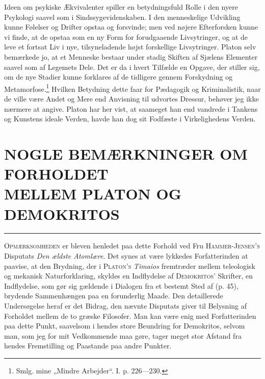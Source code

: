 \documentclass[12pt,a4paper,openany]{book}
\newcommand{\opage}[1]{\marginnote{\footnotesize\textit{[#1]}}}
\newcommand{\essay}[2][]{\chapter*{#2}\addcontentsline{toc}{chapter}{#1}}   %
\newcommand{\streg}{\begin{center}\rule{3em}{0.4pt}\end{center}}
\begin{document}
Ideen om psykiske Ækvivalenter spiller en betydningsfuld
Rolle i den nyere Psykologi saavel som i Sindssygevidenskaben.
I den menneskelige Udvikling kunne Følelser og Drifter opstaa og
forsvinde; men ved nøjere Efterforsken kunne vi finde, at de
opstaa som en ny Form for forudgaaende Livsytringer, og at
de leve et fortsat Liv i nye, tilsyneladende højst forskellige Livsytringer.
Platon selv bemærkede jo, at et Menneske bestaar
under stadig Skiften af Sjælens Elementer saavel som af Legemets
Dele. Det er da i hvert Tilfælde en Opgave, der stiller
sig, om de nye Stadier kunne forklares af de tidligere gennem
\setcounter{footnote}{0}%
\opage{93}Forskydning og Metamorfose.\footnote[1]{Smlg. mine „Mindre Arbejder“. I. p. 226---230.} Hvilken Betydning dette faar
for Pædagogik og Kriminalistik, naar de ville være Andet og
Mere end Anvisning til udvortes Dressur, behøver jeg ikke
nærmere at angive. Platon har her vist, at saameget han end
vandrede i Tankens og Kunstens ideale Verden, havde han dog
sit Fodfæste i Virkelighedens Verden.

\setcounter{footnote}{0}%
\opage{94}\essay[Demokritos og Platon (1909)]{NOGLE BEMÆRKNINGER OM FORHOLDET \\ MELLEM PLATON OG DEMOKRITOS}
\streg

O\textsc{pmærksomheden} er bleven henledet paa dette Forhold
ved Fru \textsc{Hammer-Jensen’s} Disputats \textit{Den ældste Atomlære}.
Det synes at være lykkedes Forfatterinden at paavise, at
den Brydning, der i \textsc{Platon’s} \textit{Timaios} fremtræder mellem teleologisk
og mekanisk Naturforklaring, skyldes en Indflydelse af
\textsc{Demokritos}’ Skrifter, en Indflydelse, som gør sig gældende i
Dialogen fra et bestemt Sted af (p. 45), brydende Sammenhængen
paa en forunderlig Maade. Den detaillerede Undersøgelse
heraf er det Bidrag, den nævnte Disputats giver til
Belysning af Forholdet mellem de to græske Filosofer. Man
kan være enig med Forfatterinden paa dette Punkt, saavelsom
i hendes store Beundring for Demokritos, selvom man, som jeg
for mit Vedkommende maa gøre, tager meget stor Afstand fra
hendes Fremstilling og Paastande paa andre Punkter.
\end{document}
